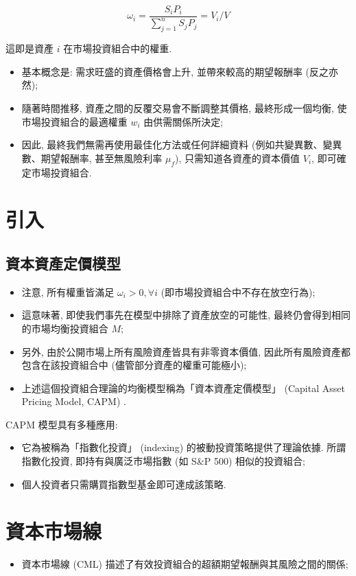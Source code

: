 \documentclass[letterpaper]{article}
\begin{document}
$$
\omega_{i}=\frac{S_{i} P_{i}}{\sum_{j=1}^{n} S_{j} P_{j}}=V_{i} / V
$$

這即是資產 $i$ 在市場投資組合中的權重. 

\begin{itemize}
	\item 基本概念是: 需求旺盛的資產價格會上升, 並帶來較高的期望報酬率 (反之亦然); 
	\item 隨著時間推移, 資產之間的反覆交易會不斷調整其價格, 最終形成一個均衡, 使市場投資組合的最適權重 $w_{i}$ 由供需關係所決定; 
	\item 因此, 最終我們無需再使用最佳化方法或任何詳細資料 (例如共變異數、變異數、期望報酬率, 甚至無風險利率 $\mu_{f}$), 只需知道各資產的資本價值 $V_{i}$, 即可確定市場投資組合. 
\end{itemize}


\section{引入}
\subsection{資本資產定價模型}
\begin{itemize}
	\item 注意, 所有權重皆滿足 $\omega_{i} > 0, \forall i$ (即市場投資組合中不存在放空行為); 
	\item 這意味著, 即使我們事先在模型中排除了資產放空的可能性, 最終仍會得到相同的市場均衡投資組合 $M$; 
	\item 另外, 由於公開市場上所有風險資產皆具有非零資本價值, 因此所有風險資產都包含在該投資組合中 (儘管部分資產的權重可能極小); 
	\item 上述這個投資組合理論的均衡模型稱為「資本資產定價模型」 (Capital Asset Pricing Model, CAPM) . 
\end{itemize}

CAPM 模型具有多種應用: 

\begin{itemize}
	\item 它為被稱為「指數化投資」 (indexing) 的被動投資策略提供了理論依據. 所謂指數化投資, 即持有與廣泛市場指數 (如 S\&P 500) 相似的投資組合; 
	\item 個人投資者只需購買指數型基金即可達成該策略. 
\end{itemize}

\section{資本市場線}
\begin{itemize}
	\item 資本市場線 (CML) 描述了有效投資組合的超額期望報酬與其風險之間的關係; 
\end{itemize}
\end{document}
